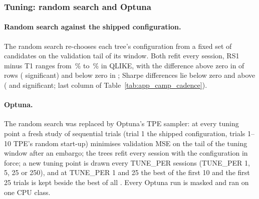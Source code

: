 \subsubsection{Tuning: random search and Optuna}
\label{sec:app_camp_tuning}

\paragraph{Random search against the shipped configuration.} The random search re-chooses
each tree's configuration from a fixed set of candidates on the validation tail of its
window. Both refit every session, RS1 minus T1 ranges from \campRSVsTQLo\,\% to
\campRSVsTQHi\,\% in QLIKE, with the difference above zero in \campRSVsTQAbove{} of
\campRSVsTN{} rows (\campRSVsTQAboveSig{} significant) and below zero in
\campRSVsTQBelow{}; \campRSVsTSBelow{} Sharpe differences lie below zero and
\campRSVsTSAbove{} above (\campRSVsTSBelowSig{} and \campRSVsTSAboveSig{} significant; last
column of Table~\ref{tab:app_camp_cadence}).

\paragraph{Optuna.} The random search was replaced by Optuna's TPE sampler: at every tuning
point a fresh study of \campOptTrials{} sequential trials (trial 1 the shipped
configuration, trials 1--10 TPE's random start-up) minimises validation MSE on the tail of
the tuning window after an embargo; the trees refit every session with the configuration in
force; a new tuning point is drawn every TUNE\_PER sessions (TUNE\_PER 1, 5, 25 or 250),
and at TUNE\_PER 1 and 25 the best of the first 10 and the first 25 trials is kept beside
the best of all \campOptTrials{}. Every Optuna run is masked and ran on one CPU class.

